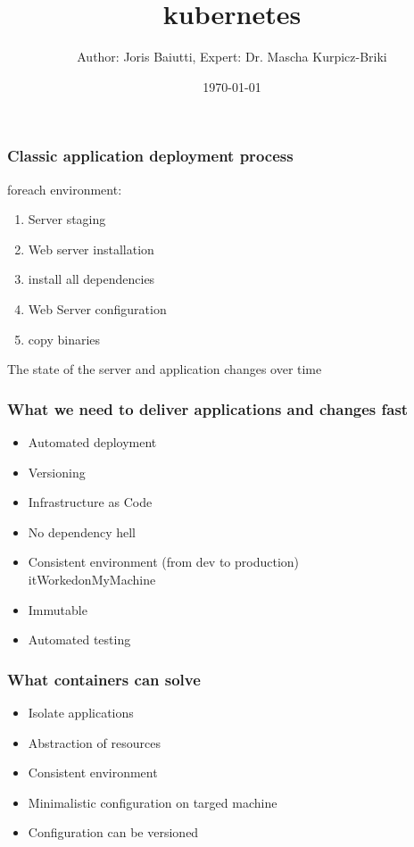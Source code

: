 \documentclass{beamer}
\title{kubernetes}
\author{Author: Joris Baiutti, Expert: Dr. Mascha Kurpicz-Briki}
\institute{Berner Fachhochschule}
\date{\today}
\begin{document}
\begin{frame}
\titlepage
\end{frame}

\begin{frame}
\frametitle{Classic application deployment process}
foreach environment:
\begin{enumerate}
    \item Server staging
    \item Web server installation
    \item install all dependencies
    \item Web Server configuration
    \item copy binaries
\end{enumerate}
The state of the server and application changes over time
    
\end{frame}

\begin{frame}
\frametitle{What we need to deliver applications and changes fast}
\begin{itemize}
    \item Automated deployment
    \item Versioning
    \item Infrastructure as Code
    \item No dependency hell
    \item Consistent environment (from dev to production)\\ 
    itWorkedonMyMachine
    \item Immutable
    \item Automated testing
\end{itemize}
\end{frame}

\begin{frame}
\frametitle{What containers can solve}
\begin{itemize}
    \item Isolate applications
    \item Abstraction of resources
    \item Consistent environment
    \item Minimalistic configuration on targed machine
    \item Configuration can be versioned
\end{itemize}
\end{frame}
\end{document}
